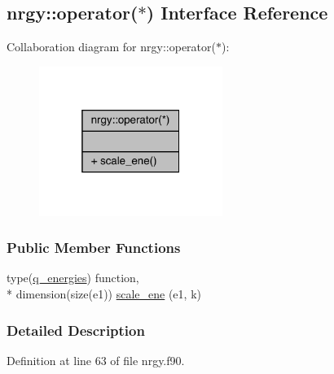 \hypertarget{interfacenrgy_1_1operator_07_5_08}{\subsection{nrgy\-:\-:operator($\ast$) Interface Reference}
\label{interfacenrgy_1_1operator_07_5_08}
}


Collaboration diagram for nrgy\-:\-:operator($\ast$)\-:
\nopagebreak
\begin{figure}[H]
\begin{center}
\leavevmode
\includegraphics[width=169pt]{interfacenrgy_1_1operator_07_5_08__coll__graph}
\end{center}
\end{figure}
\subsubsection*{Public Member Functions}
\begin{DoxyCompactItemize}
\item 
type(\hyperlink{structnrgy_1_1q__energies}{q\-\_\-energies}) function, \\*
dimension(size(e1)) \hyperlink{interfacenrgy_1_1operator_07_5_08_a27c639fb0a103ad64ab1d1562ce679e0}{scale\-\_\-ene} (e1, k)
\end{DoxyCompactItemize}


\subsubsection{Detailed Description}


Definition at line 63 of file nrgy.\-f90.



